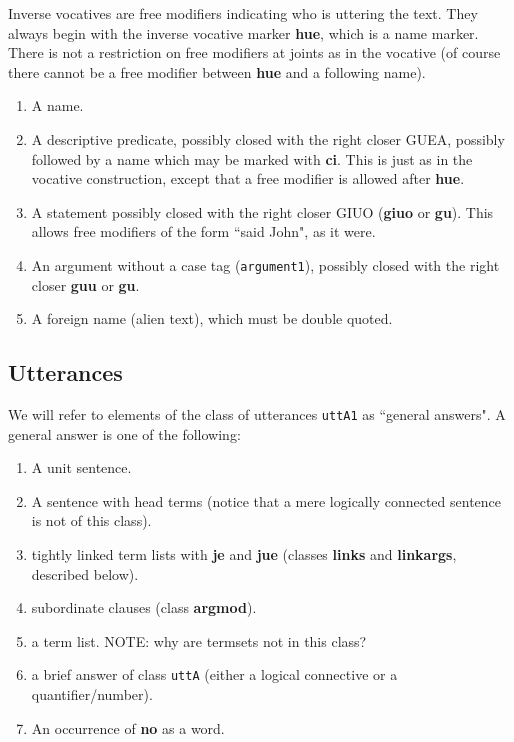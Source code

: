 \documentclass[12pt]{book}
\begin{document}
Inverse vocatives are free modifiers indicating who is uttering the text.  They always begin with the inverse vocative marker {\bf hue}, which is a name marker.  There is not a restriction on free modifiers at joints as in the vocative (of course there cannot be a free modifier between {\bf hue} and a following name).

\begin{enumerate}


\item  A name.

\item  A descriptive predicate, possibly closed with the right closer GUEA, possibly followed by a name which may be marked with {\bf ci}.  This is just as in the vocative construction, except that a free modifier is allowed after {\bf hue}.

\item  A statement possibly closed with the right closer GIUO ({\bf giuo} or {\bf gu}).  This allows free modifiers of the form ``said John", as it were.

\item An argument without a case tag ({\tt argument1}), possibly closed with the right closer {\bf guu} or {\bf gu}.

\item  A foreign name (alien text), which must be double quoted.

\end{enumerate}

\subsection{Utterances}

We will refer to elements of the class of utterances {\tt uttA1} as ``general answers".   A general answer is one of the following:

\begin{enumerate}

\item A unit sentence.

\item  A sentence with head terms (notice that a mere logically connected sentence is not of this class).

\item  tightly linked term lists with {\bf je} and {\bf jue} (classes {\bf links} and {\bf linkargs}, described below).

\item  subordinate clauses (class {\bf argmod}).

\item a term list.  NOTE:  why are termsets not in this class?

\item a brief answer of class {\tt uttA} (either a logical connective or a quantifier/number).

\item An occurrence of {\bf no} as a word.

\end{enumerate}
\end{document}
